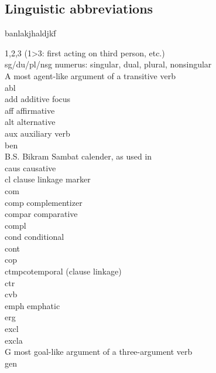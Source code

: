 \label{abbreviations}
\begin{refsection}

\section*{Linguistic abbreviations}

 {\small
\begin{tabbing}
banlakjhaldjkf\= \kill

1,2,3 		\> (1>3: first acting on third person, etc.)\\
{\sc sg/du/pl/nsg} 		\> numerus: singular, dual, plural, nonsingular\\
A		\> most agent-like argument of a transitive verb\\
{\sc abl} \> \\
{\sc add}\> additive focus\\
{\sc aff} \> affirmative\\
{\sc alt} \> alternative\\
{\sc aux}\> auxiliary verb\\
{\sc ben}		\>  \\
{\sc B.S.}		\> Bikram Sambat calender, as used in \\
{\sc caus} \> causative\\
{\sc cl}\> clause linkage marker\\
{\sc com} \> \\
{\sc comp} \> complementizer\\
{\sc compar} \> comparative\\
{\sc compl}\> \\
{\sc cond} \> conditional\\
{\sc cont}\>\\
{\sc cop} \> \\
{\sc ctmp}\>cotemporal (clause linkage)\\
{\sc ctr} \> \\
{\sc cvb} \> \\
{\sc emph} \> emphatic\\
{\sc erg} \>  \\
{\sc excl} \> \\
{\sc excla}\> \\
G \> most goal-like argument of a three-argument verb\\
{\sc gen} \> \\

\end{tabbing}}
\end{refsection}
